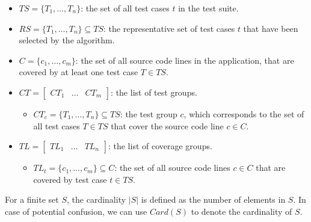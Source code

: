 \begin{definition}
\label{def:alg-naming}
\mbox{}
\begin{itemize}
	\item $TS = \{T_1, \dots, T_n\}$: the set of all test cases $t$ in the test suite.
	\item $RS = \{T_1, \dots, T_n\} \subseteq TS$: the representative set of test cases $t$ that have been selected by the algorithm.
	\item $C = \{c_1, \dots, c_m\}$: the set of all source code lines in the application, that are covered by at least one test case $T \in TS$.
	\item $CT = \begin{bmatrix}
		CT_1 & \dots & CT_m
	\end{bmatrix}$: the list of test groups.
		\begin{itemize}
			\item $CT_c = \{T_1, \dots, T_n\} \subseteq TS$: the test group $c$, which corresponds to the set of all test cases $T \in TS$ that cover the source code line $c \in C$.
		\end{itemize}
	\item $TL = \begin{bmatrix}
		TL_1 & \dots & TL_n
	\end{bmatrix}$: the list of coverage groups.
		\begin{itemize}
			\item $TL_t = \{c_1, \dots, c_m\} \subseteq C$: the set of all source code lines $c \in C$ that are covered by test case $t \in TS$.
		\end{itemize}
\end{itemize}
\end{definition}

\begin{definition}[Cardinality]
\label{def:cardinality}
For a finite set $S$, the cardinality $|S|$ is defined as the number of elements in $S$. In case of potential confusion, we can use $Card(S)$ to denote the cardinality of $S$.
\end{definition}


\clearpage

\clearpage
